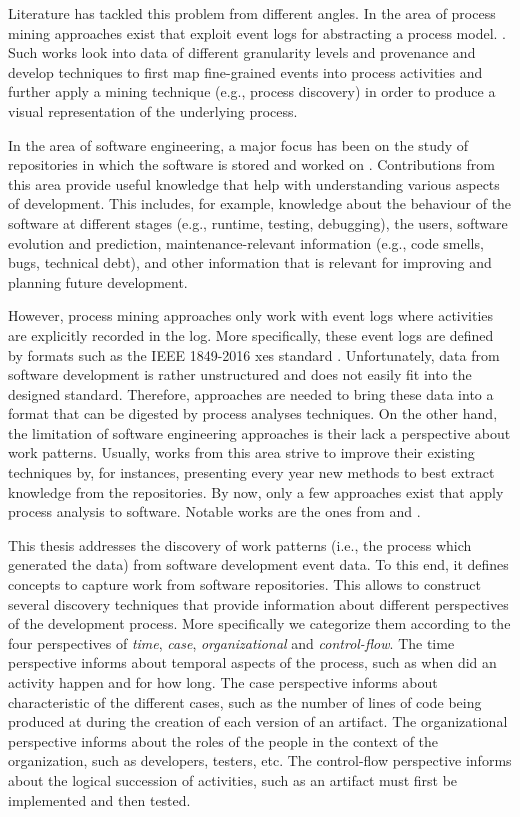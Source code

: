 Literature has tackled this problem from different angles. In the area of process mining approaches exist that exploit event logs for abstracting a process model.  \citep{Zerbino2021,vanZelst2021,DBLP:journals/tkde/AugustoCDRMMMS19,Rojas2016}. 
Such works look into data of different granularity levels and provenance and develop techniques to first map fine-grained events into process activities and further apply a mining technique (e.g., process discovery) in order to produce a visual representation of the underlying process. 

In the area of software engineering, a major focus has been on the study of repositories in which the software is stored and worked on \citep{Farias2016,Matthies2020,Barros2021}. Contributions from this area provide useful knowledge that help with understanding various aspects of development. This includes, for example, knowledge about the behaviour of the software at different stages (e.g., runtime, testing, debugging), the users, software evolution and prediction, maintenance-relevant information (e.g., code smells, bugs, technical debt), and other information that is relevant for improving and planning future development.

However, process mining approaches only work with event logs where activities are explicitly recorded in the log. More specifically, these event logs are defined by formats such as the IEEE 1849-2016 \gls{xes} standard \citep{xes-standard:2015}.
Unfortunately, data from software development is rather unstructured and does not easily fit into the designed standard. Therefore, approaches are needed to bring these data into a format that can be digested by process analyses techniques. 
On the other hand, the limitation of software engineering approaches is their lack a perspective about work patterns. Usually, works from this area strive to improve their existing techniques by, for instances, presenting every year new methods to best extract knowledge from the repositories. By now, only a few approaches exist that apply process analysis to software. Notable works are the ones from \citet{DBLP:conf/csmr/PoncinSB11} and \citet{Mittal2014}.


This thesis addresses the discovery of work patterns (i.e., the process which generated the data) from software development event data. To this end, it defines concepts to capture work from software repositories. This allows to construct several discovery techniques that provide information about different perspectives of the development process. More specifically we categorize them according to the four perspectives \citep{DBLP:books/sp/Aalst16} of \emph{time}, \emph{case}, \emph{organizational} and \emph{control-flow}. The time perspective informs about temporal aspects of the process, such as when did an activity happen and for how long. The case perspective informs about characteristic of the different cases, such as the number of lines of code being produced at during the creation of each version of an artifact. The organizational perspective informs about the roles of the people in the context of the organization, such as developers, testers, etc. The control-flow perspective informs about the logical succession of activities, such as an artifact must first be implemented and then tested. 


